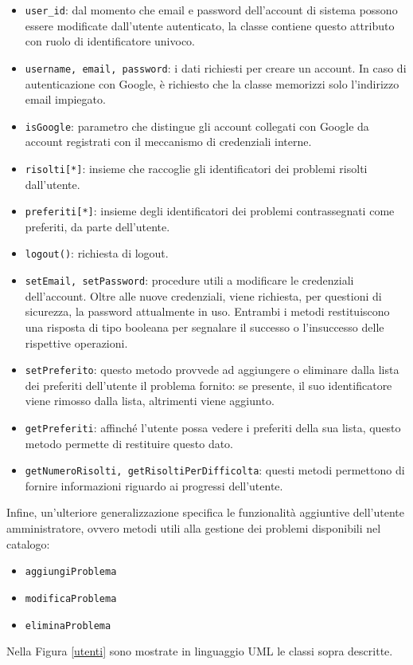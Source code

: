 \documentclass[11pt, a4paper]{article}
\theoremstyle{definition} %
\begin{document}
\begin{itemize}
    \item \texttt{user\_id}: dal momento che email e password dell'account di sistema
    possono essere modificate dall'utente autenticato, la classe contiene questo
    attributo con ruolo di identificatore univoco.

    \item \texttt{username, email, password}: i dati richiesti per creare un
    account. In caso di autenticazione con Google, è richiesto che la classe
    memorizzi solo l'indirizzo email impiegato.

    \item \texttt{isGoogle}: parametro che distingue gli account collegati con
    Google da account registrati con il meccanismo di credenziali interne.

    \item \texttt{risolti[*]}: insieme che raccoglie gli identificatori dei problemi
    risolti dall'utente.

    \item \texttt{preferiti[*]}: insieme degli identificatori dei problemi
    contrassegnati come preferiti, da parte dell'utente.

    \item \texttt{logout()}: richiesta di logout.
    
    \item \texttt{setEmail, setPassword}: procedure utili a modificare le credenziali
    dell'account. Oltre alle nuove credenziali, viene richiesta, per questioni di sicurezza,
    la password attualmente in uso. Entrambi i metodi restituiscono una risposta
    di tipo booleana per segnalare il successo o l'insuccesso delle rispettive operazioni.

    \item \texttt{setPreferito}: questo metodo provvede ad aggiungere o
    eliminare dalla lista dei preferiti dell'utente il problema fornito: se
    presente, il suo identificatore viene rimosso dalla lista, altrimenti
    viene aggiunto.

    \item \texttt{getPreferiti}: affinché l'utente possa vedere i preferiti
    della sua lista, questo metodo permette di restituire questo dato.

    \item \texttt{getNumeroRisolti, getRisoltiPerDifficolta}: questi metodi
    permettono di fornire informazioni riguardo ai progressi dell'utente.
\end{itemize}
Infine, un'ulteriore generalizzazione specifica le funzionalità aggiuntive
dell'utente amministratore, ovvero metodi utili alla gestione dei problemi
disponibili nel catalogo:
\begin{itemize}
    \item \texttt{aggiungiProblema}
    \item \texttt{modificaProblema}
    \item \texttt{eliminaProblema}
\end{itemize}
Nella Figura \ref{utenti} sono mostrate in linguaggio UML le classi
sopra descritte.
\end{document}
